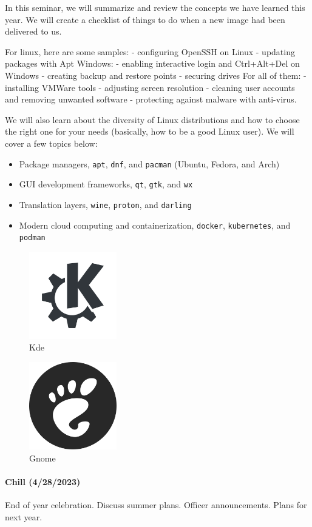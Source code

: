 \documentclass[
  letterpaper,
  DIV=11,
  numbers=noendperiod]{scrartcl}
\let\oldparagraph\paragraph
\renewcommand{\paragraph}[1]{\oldparagraph{#1}\mbox{}}
\providecommand{\tightlist}{%
  \setlength{\itemsep}{0pt}\setlength{\parskip}{0pt}}\usepackage{longtable,booktabs,array}
\begin{document}
In this seminar, we will summarize and review the concepts we have
learned this year. We will create a checklist of things to do when a new
image had been delivered to us.

For linux, here are some samples: - configuring OpenSSH on Linux -
updating packages with Apt Windows: - enabling interactive login and
Ctrl+Alt+Del on Windows - creating backup and restore points - securing
drives For all of them: - installing VMWare tools - adjusting screen
resolution - cleaning user accounts and removing unwanted software -
protecting against malware with anti-virus.

We will also learn about the diversity of Linux distributions and how to
choose the right one for your needs (basically, how to be a good Linux
user). We will cover a few topics below:

\begin{itemize}
\tightlist
\item
  Package managers, \texttt{apt}, \texttt{dnf}, and \texttt{pacman}
  (Ubuntu, Fedora, and Arch)
\item
  GUI development frameworks, \texttt{qt}, \texttt{gtk}, and \texttt{wx}
\item
  Translation layers, \texttt{wine}, \texttt{proton}, and
  \texttt{darling}
\item
  Modern cloud computing and containerization, \texttt{docker},
  \texttt{kubernetes}, and \texttt{podman}
\end{itemize}

\begin{figure}

{\centering \includegraphics[width=\textwidth,height=1.5in]{images/kde.png}

}

\caption{Kde}

\end{figure}

\begin{figure}

{\centering \includegraphics[width=\textwidth,height=1.5in]{images/gnome.png}

}

\caption{Gnome}

\end{figure}

\hypertarget{chill-4282023}{%
\paragraph{Chill (4/28/2023)}\label{chill-4282023}}

End of year celebration. Discuss summer plans. Officer announcements.
Plans for next year.
\end{document}
